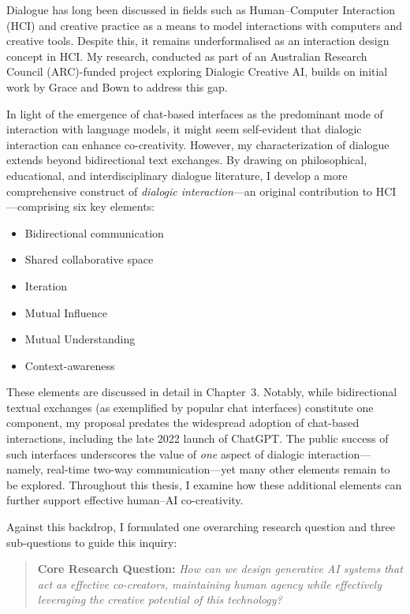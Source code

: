 Dialogue has long been discussed in fields such as Human--Computer Interaction (HCI) and creative practice as a means to model interactions with computers and creative tools. Despite this, it remains underformalised as an interaction design concept in HCI. My research, conducted as part of an Australian Research Council (ARC)-funded project exploring Dialogic Creative AI, builds on initial work by Grace and Bown to address this gap.

In light of the emergence of chat-based interfaces as the predominant mode of interaction with language models, it might seem self-evident that dialogic interaction can enhance co-creativity. However, my characterization of dialogue extends beyond bidirectional text exchanges. By drawing on philosophical, educational, and interdisciplinary dialogue literature, I develop a more comprehensive construct of \emph{dialogic interaction}---an original contribution to HCI---comprising six key elements:

\begin{itemize}
    \item Bidirectional communication
    \item Shared collaborative space
    \item Iteration
    \item Mutual Influence
    \item Mutual Understanding
    \item Context-awareness
\end{itemize}

These elements are discussed in detail in Chapter~3. Notably, while bidirectional textual exchanges (as exemplified by popular chat interfaces) constitute one component, my proposal predates the widespread adoption of chat-based interactions, including the late 2022 launch of ChatGPT. The public success of such interfaces underscores the value of \emph{one} aspect of dialogic interaction---namely, real-time two-way communication---yet many other elements remain to be explored. Throughout this thesis, I examine how these additional elements can further support effective human--AI co-creativity.

Against this backdrop, I formulated one overarching research question and three sub-questions to guide this inquiry:

\begin{quote}
\textbf{Core Research Question:}
\emph{How can we design generative AI systems that act as effective co-creators, maintaining human agency while effectively leveraging the creative potential of this technology?}
\end{quote}

